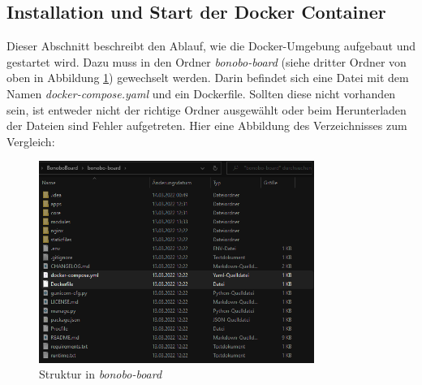 \documentclass[a4paper,11pt]{scrartcl}
\begin{document}
\subsection{Installation und Start der Docker Container}
Dieser Abschnitt beschreibt den Ablauf, wie die Docker-Umgebung aufgebaut und gestartet wird. Dazu muss in den Ordner \textit{bonobo-board} (siehe dritter Ordner von oben in Abbildung \ref{img:folder_1}) gewechselt werden. Darin befindet sich eine Datei mit dem Namen \textit{docker-compose.yaml} und ein Dockerfile. Sollten diese nicht vorhanden sein, ist entweder nicht der richtige Ordner ausgewählt oder beim Herunterladen der Dateien sind Fehler aufgetreten. Hier eine Abbildung des Verzeichnisses zum Vergleich:
\begin{figure}[H]
\begin{center}
\includegraphics[width=0.8\textwidth]{folder_repo_2}
\caption{Struktur in \textit{bonobo-board}}
\label{img:folder_1}
\end{center}
\end{figure}
\end{document}
